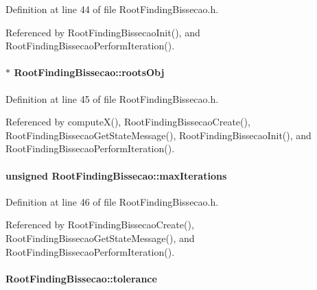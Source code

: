 Definition at line 44 of file RootFindingBissecao.h.

Referenced by RootFindingBissecaoInit(), and RootFindingBissecaoPerformIteration().\hypertarget{structRootFindingBissecao_5041e5b19cdb436273b9d11557aa8c63}{
\paragraph[rootsObj]{$\ast$ {\bf RootFindingBissecao::rootsObj}}\hfill}
\label{structRootFindingBissecao_5041e5b19cdb436273b9d11557aa8c63}




Definition at line 45 of file RootFindingBissecao.h.

Referenced by computeX(), RootFindingBissecaoCreate(), RootFindingBissecaoGetStateMessage(), RootFindingBissecaoInit(), and RootFindingBissecaoPerformIteration().\hypertarget{structRootFindingBissecao_06b978677910f6ff08dd4a521aba0c83}{
\paragraph[maxIterations]{\setlength{\rightskip}{0pt plus 5cm}unsigned {\bf RootFindingBissecao::maxIterations}}\hfill}
\label{structRootFindingBissecao_06b978677910f6ff08dd4a521aba0c83}




Definition at line 46 of file RootFindingBissecao.h.

Referenced by RootFindingBissecaoCreate(), RootFindingBissecaoGetStateMessage(), and RootFindingBissecaoPerformIteration().\hypertarget{structRootFindingBissecao_94385d4daec400300058b676fa1637a6}{
\paragraph[tolerance]{ {\bf RootFindingBissecao::tolerance}}\hfill}
\label{structRootFindingBissecao_94385d4daec400300058b676fa1637a6}




